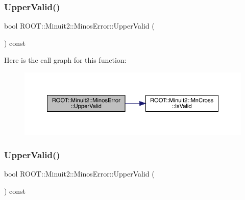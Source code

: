 \subsubsection{\texorpdfstring{UpperValid()}{UpperValid()}\hspace{0.1cm}{\footnotesize\ttfamily [1/2]}}
{\footnotesize\ttfamily bool R\+O\+O\+T\+::\+Minuit2\+::\+Minos\+Error\+::\+Upper\+Valid (\begin{DoxyParamCaption}{ }\end{DoxyParamCaption}) const\hspace{0.3cm}{\ttfamily [inline]}}

Here is the call graph for this function\+:
\nopagebreak
\begin{figure}[H]
\begin{center}
\leavevmode
\includegraphics[width=350pt]{d2/dd1/classROOT_1_1Minuit2_1_1MinosError_a4180ae7ff87d9a2c0942c8e6ac81a8c0_cgraph}
\end{center}
\end{figure}
\mbox{\label{classROOT_1_1Minuit2_1_1MinosError_a4180ae7ff87d9a2c0942c8e6ac81a8c0}} 
\subsubsection{\texorpdfstring{UpperValid()}{UpperValid()}\hspace{0.1cm}{\footnotesize\ttfamily [2/2]}}
{\footnotesize\ttfamily bool R\+O\+O\+T\+::\+Minuit2\+::\+Minos\+Error\+::\+Upper\+Valid (\begin{DoxyParamCaption}{ }\end{DoxyParamCaption}) const\hspace{0.3cm}{\ttfamily [inline]}}

